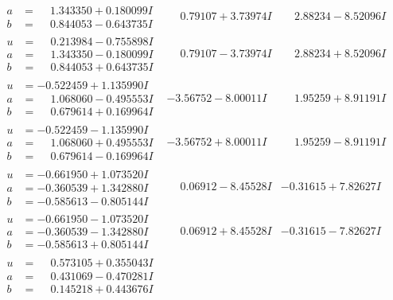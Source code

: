 \documentclass[1p]{elsarticle_modified}
\theoremstyle{definition}
\begin{document}
$$\begin{array}{c|c|c}
\begin{aligned}
a &= \phantom{-}1.343350 + 0.180099 I \\
b &= \phantom{-}0.844053 - 0.643735 I\end{aligned}
 & \phantom{-}0.79107 + 3.73974 I & \phantom{-}2.88234 - 8.52096 I \\ \hline\begin{aligned}
u &= \phantom{-}0.213984 - 0.755898 I \\
a &= \phantom{-}1.343350 - 0.180099 I \\
b &= \phantom{-}0.844053 + 0.643735 I\end{aligned}
 & \phantom{-}0.79107 - 3.73974 I & \phantom{-}2.88234 + 8.52096 I \\ \hline\begin{aligned}
u &= -0.522459 + 1.135990 I \\
a &= \phantom{-}1.068060 - 0.495553 I \\
b &= \phantom{-}0.679614 + 0.169964 I\end{aligned}
 & -3.56752 - 8.00011 I & \phantom{-}1.95259 + 8.91191 I \\ \hline\begin{aligned}
u &= -0.522459 - 1.135990 I \\
a &= \phantom{-}1.068060 + 0.495553 I \\
b &= \phantom{-}0.679614 - 0.169964 I\end{aligned}
 & -3.56752 + 8.00011 I & \phantom{-}1.95259 - 8.91191 I \\ \hline\begin{aligned}
u &= -0.661950 + 1.073520 I \\
a &= -0.360539 + 1.342880 I \\
b &= -0.585613 - 0.805144 I\end{aligned}
 & \phantom{-}0.06912 - 8.45528 I & -0.31615 + 7.82627 I \\ \hline\begin{aligned}
u &= -0.661950 - 1.073520 I \\
a &= -0.360539 - 1.342880 I \\
b &= -0.585613 + 0.805144 I\end{aligned}
 & \phantom{-}0.06912 + 8.45528 I & -0.31615 - 7.82627 I \\ \hline\begin{aligned}
u &= \phantom{-}0.573105 + 0.355043 I \\
a &= \phantom{-}0.431069 - 0.470281 I \\
b &= \phantom{-}0.145218 + 0.443676 I\end{aligned}

\end{array}$$
\end{document}

